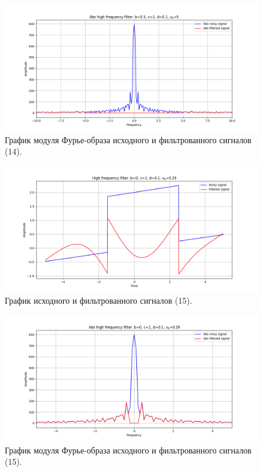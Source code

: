 \documentclass[a4paper, 12pt]{article}
\begin{document}
    \begin{figure}[!htb]
        \centering
        \includegraphics[scale=0.48]{14_abs_u_U_nolow.png}
        \captionsetup{skip=0pt}
        \caption{График модуля Фурье-образа исходного и фильтрованного сигналов (14).}
        \label{fig:fig54}
    \end{figure}
    \begin{figure}[!htb]
        \centering
        \includegraphics[scale=0.48]{15_u_flt_u_nolow.png}
        \captionsetup{skip=0pt}
        \caption{График исходного и фильтрованного сигналов (15).}
        \label{fig:fig55}
    \end{figure}
    \newpage
    \begin{figure}[!htb]
        \centering
        \includegraphics[scale=0.48]{15_abs_u_U_nolow.png}
        \captionsetup{skip=0pt}
        \caption{График модуля Фурье-образа исходного и фильтрованного сигналов (15).}
        \label{fig:fig56}
    \end{figure}
\end{document}

